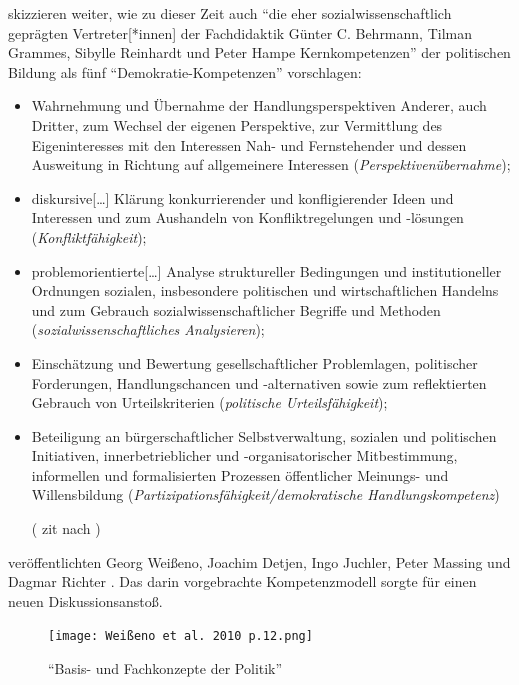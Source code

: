 \textcite[106-107]{Gloe2020} skizzieren weiter, wie zu dieser Zeit auch 
\enquote{die eher sozialwissenschaftlich geprägten Vertreter[*innen] der Fachdidaktik Günter C. Behrmann, Tilman Grammes, Sibylle Reinhardt und Peter Hampe Kernkompetenzen} der politischen Bildung als fünf \enquote{Demokratie-Kompetenzen} vorschlagen:
\begin{itemize}
    \item Wahrnehmung und Übernahme der Handlungsperspektiven Anderer, auch Dritter, zum Wechsel der eigenen Perspektive, zur Vermittlung des Eigeninteresses mit den Interessen Nah- und Fernstehender und dessen Ausweitung in Richtung auf allgemeinere Interessen (\emph{Perspektivenübernahme}); 
    \item diskursive[\dots] Klärung konkurrierender und konfligierender Ideen und Interessen und zum Aushandeln von Konfliktregelungen und -lösungen (\emph{Konfliktfähigkeit}); 
    \item problemorientierte[\dots] Analyse struktureller Bedingungen und institutioneller Ordnungen sozialen, insbesondere politischen und wirtschaftlichen Handelns und zum Gebrauch sozialwissenschaftlicher Begriffe und Methoden (\emph{sozialwissenschaftliches Analysieren}); 
    \item Einschätzung und Bewertung gesellschaftlicher Problemlagen, politischer Forderungen, Handlungschancen und -alternativen sowie zum reflektierten Gebrauch von Urteilskriterien (\emph{politische Urteilsfähigkeit}); 
    \item Beteiligung an bürgerschaftlicher Selbstverwaltung, sozialen und politischen Initiativen, innerbetrieblicher und -organisatorischer Mitbestimmung, informellen und formalisierten Prozessen öffentlicher Meinungs- und Willensbildung (\emph{Partizipationsfähigkeit/demokratische Handlungskompetenz}) 

    (\textcite[337 f.]{Behrmann.2004} \gls{zit} nach \textcite[106-107]{Gloe2020})
\end{itemize}
\citeyear{weißeno.2010} veröffentlichten Georg Weißeno, Joachim Detjen, Ingo Juchler, Peter Massing und Dagmar Richter . Das darin vorgebrachte Kompetenzmodell %
sorgte für einen neuen Diskussionsanstoß. 
\begin{figure}[htb]
    \centering
    \texttt{[image: Weißeno et al. 2010 p.12.png]}
    \caption{\enquote{Basis- und Fachkonzepte der Politik} \autocite[12]{weißeno.2010}}
    \label{2010kompMod}
\end{figure}
